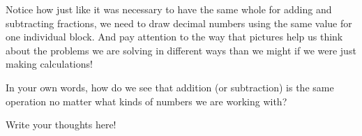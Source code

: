\documentclass{ximera}
\begin{document}
Notice how just like it was necessary to have the same whole for adding and subtracting fractions, we need to draw decimal numbers using the same value for one individual block. And pay attention to the way that pictures help us think about the problems we are solving in different ways than we might if we were just making calculations!


\begin{question}
In your own words, how do we see that addition (or subtraction) is the same operation no matter what kinds of numbers we are working with?
\begin{freeResponse}
Write your thoughts here!
\end{freeResponse}
\end{question}
\end{document}
